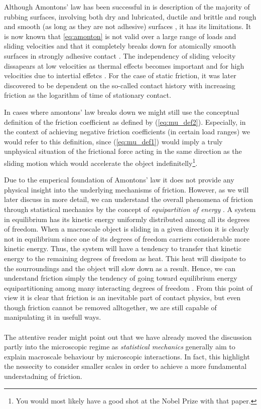Although Amontons' law has been successful in is description of the majority of
rubbing surfaces, involving both dry and lubricated, ductile and brittle and
rough and smooth (as long as they are not adhesive) surfaces \cite{gao_frictional_2004},
it has its limitations. It is now known that \cref{eq:amonton} is not valid
over a large range of loads and sliding velocities and that it completely breaks
down for atomically smooth surfaces in strongly adhesive contact
\cite{gao_frictional_2004}. The independency of sliding velocity dissapears at
low velocities as thermal effects becomes important and for high velocities due
to intertial effetcs \cite[pp. 5-6]{gnecco_meyer_2015}. For the case of static
friction, it was later discovered to be dependent on the so-called contact
history with increasing friction as the logarithm of time of stationary contact.

In cases where amontons' law breaks down we might still use the conceptual
definition of the friction coefficient as defined by (\cref{eq:mu_def2}).
Especially, in the context of achieving negative friction coefficients (in certain load ranges) we would refer to this definition, since (\cref{eq:mu_def1}) would imply a truly unphysical situation of the frictional force acting in the same direction as the sliding motion which would accelerate the object indefinitelly\footnote{You would most likely have a good shot at the Nobel Prize with that paper.}.

Due to the emperical foundation of Amontons’ law it does not provide
any physical insight into the underlying mechanisms of friction. However, as we
will later discuss in more detail, we can understand the overall phenomena of
friction through statistical mechanics by the concept of \textit{equipartition
of energy} \cite{Manini_2016}. A system in equilibrium has its kinetic energy
uniformly distributed among all its degrees of freedom. When a macroscale object
is sliding in a given direction it is clearly not in equilibrium since one of
its degrees of freedom carriers considerable more kinetic energy. Thus, the
system will have a tendency to transfer that kinetic energy to the remaining
degrees of freedom as heat. This heat will dissipate to the sourroundings and
the object will slow down as a result. Hence, we can understand friction simply the tendency of going toward equilibrium energy equipartitioning among many
interacting degrees of freedom \cite{Manini_2016}. From this point of view it is
clear that friction is an inevitable part of contact physics, but even though
friction cannot be removed alltogether, we are still capable of manipulating it in
usefull ways. \\
\\
The attentive reader might point out that we have already moved the discussion
partly into the microscopic regime as \textit{statistical mechanics} generally
aim to explain macroscale behaviour by microscopic interactions. In fact, this 
highlight the nessecity to consider smaller scales in order to achieve a more fundamental understadning of friction.


